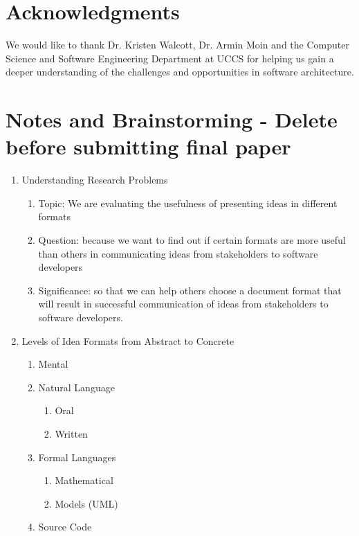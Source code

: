 \documentclass{acm_proc_article-sp}
\begin{document}
\section{Acknowledgments}
We would like to thank Dr. Kristen Walcott, Dr. Armin Moin and the Computer Science and Software Engineering Department at UCCS for helping us gain a deeper understanding of the challenges and opportunities in software architecture.

\section{Notes and Brainstorming - Delete before submitting final paper}
\begin{enumerate}
	\item Understanding Research Problems
	\begin{enumerate}
		\item Topic: We are evaluating the usefulness of presenting ideas in different formats 
		\item Question: because we want to find out if certain formats are more useful than others in communicating ideas from stakeholders to software developers
		\item Significance: so that we can help others choose a document format that will result in successful communication of ideas from stakeholders to software developers. 
	\end{enumerate}
	\item Levels of Idea Formats from Abstract to Concrete
	\begin{enumerate}
		\item Mental
		\item Natural Language
		\begin{enumerate}
			\item Oral
			\item Written
		\end{enumerate}
			
		\item Formal Languages
		\begin{enumerate}
			\item Mathematical
			\item Models (UML)
		\end{enumerate}
		\item Source Code
	\end{enumerate}
\end{enumerate}

 
%

%
%

\balancecolumns
\end{document}
